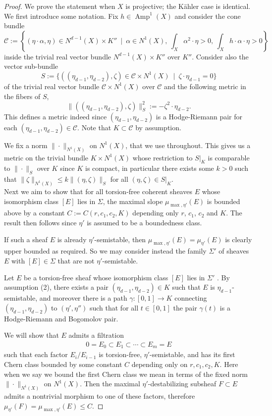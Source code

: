 \documentclass[a4,reqno]{amsart}
\theoremstyle{definition}
\def\cC{\mathcal C }
\DeclareMathOperator{\Amp}{Amp}
\numberwithin{equation}{section}
\begin{document}
\begin{proof}
We prove the statement when $X$ is projective; the K\"ahler case is identical. We first introduce some notation. Fix $h\in \Amp^1(X)$ and consider the cone bundle 
$$\cC:=\left\{(\eta\cdot \alpha, \eta)\in  N^{d-1}(X)\times K'' \ \mid \ \alpha\in N^1(X), \ \int_X \alpha^2\cdot\eta>0, \ \int_X h\cdot \alpha\cdot\eta>0\right \}$$ 
inside the trivial real vector bundle $N^{d-1}(X)\times K''$ over $K''$. Consider also the vector sub-bundle 
$$S:=\{ ((\eta_{d-1},\eta_{d-2}),\zeta)\in \cC\times N^1(X) \ \mid \ \zeta \cdot \eta_{d-1}=0\}$$
of the trivial real vector bundle $\cC\times N^{1}(X)$ over $\cC$
and the following metric in the fibers of $S$, 
$$ \| ((\eta_{d-1},\eta_{d-2}),\zeta)\|_S^2:=-\zeta^2\cdot\eta_{d-2}.$$
This defines a metric indeed since $(\eta_{d-1},\eta_{d-2})$ is a Hodge-Riemann pair for each $(\eta_{d-1},\eta_{d-2}) \in \cC$. Note that $K\subset \cC$ by assumption. 

We fix a norm $\| \cdot \|_{N^1(X)}$ on $N^1(X)$, that we use throughout. This gives us a metric on the trivial  bundle $K\times N^1(X)$ whose  restriction to $S|_{K}$ is comparable to $\|\cdot \|_{S}$ over $K$ since $K$ is compact, in particular there exists some $k>0$ such that $\| \zeta \|_{N^1(X)}\le k\|  (\eta,\zeta)\|_S$  for all $(\eta,\zeta)\in S|_{K}$.\\

Next we aim to show that for all torsion-free coherent sheaves $E$ whose isomorphism class $[E]$ lies in $\Sigma$, the maximal slope $\mu_{\max,\eta'}(E)$ is bounded above by a constant $C := C(r,c_1,c_2,K)$ depending only $r$, $c_1$, $c_2$ and $K$. The result then follows since $\eta'$ is assumed to be a boundedness class. 

If such a sheaf $E$ is already $\eta'$-semistable, then $\mu_{\max,\eta'}(E) = \mu_{\eta'}(E)$ is clearly upper bounded as required. So we may consider instead the family $\Sigma'$ of sheaves $E$ with $[E] \in \Sigma$ that are not $\eta'$-semistable.

Let $E$ be a torsion-free sheaf whose isomorphism class $[E]$ lies in $\Sigma'$ . By assumption (2), there exists a pair $(\eta_{d-1},\eta_{d-2}) \in K$ such that $E$ is $\eta_{d-1}$-semistable, and moreover there is a path $\gamma : [0,1] \to K$ connecting $(\eta_{d-1},\eta_{d-2})$ to $(\eta',\eta'')$ such that for all $t \in [0,1]$ the pair $\gamma(t)$ is a Hodge-Riemann and Bogomolov pair. 

We will show that $E$ admits a filtration
\begin{align*}
     0 = E_0 \subset E_1 \subset \cdots \subset E_m =E
\end{align*}
such that each factor $E_i/E_{i-1}$ is torsion-free, $\eta'$-semistable, and has its first Chern class bounded by some constant $C$ depending only on $r, c_1, c_2, K$. Here when we say we bound the first Chern class we mean in terms of the fixed norm $\| \cdot \|_{N^1(X)}$ on $N^1(X)$. Then the maximal $\eta'$-destabilizing subsheaf $F \subset E$ admits a nontrivial morphism to one of these factors, therefore $\mu_{\eta'}(F) = \mu_{\max,\eta'}(E) \le C$. 


\end{proof}
\end{document}
